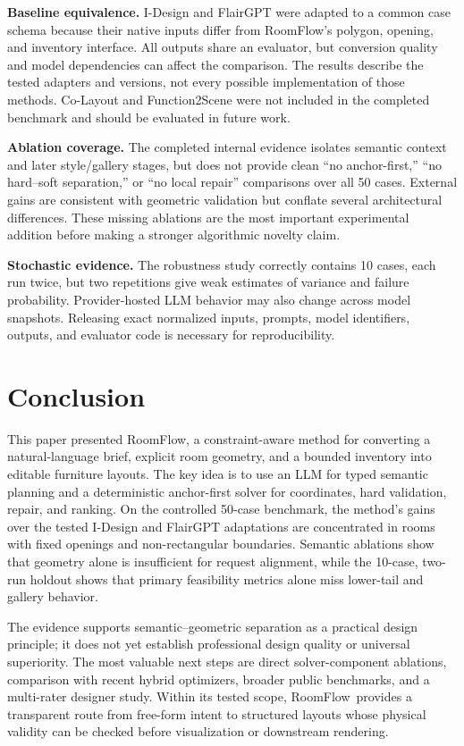 \documentclass[pdflatex,sn-mathphys-num]{sn-jnl}
\newcommand{\method}{RoomFlow}
\begin{document}
\textbf{Baseline equivalence.} I-Design and FlairGPT were adapted to a common case schema because their native inputs differ from \method's polygon, opening, and inventory interface. All outputs share an evaluator, but conversion quality and model dependencies can affect the comparison. The results describe the tested adapters and versions, not every possible implementation of those methods. Co-Layout and Function2Scene were not included in the completed benchmark and should be evaluated in future work.

\textbf{Ablation coverage.} The completed internal evidence isolates semantic context and later style/gallery stages, but does not provide clean ``no anchor-first,'' ``no hard--soft separation,'' or ``no local repair'' comparisons over all 50 cases. External gains are consistent with geometric validation but conflate several architectural differences. These missing ablations are the most important experimental addition before making a stronger algorithmic novelty claim.

\textbf{Stochastic evidence.} The robustness study correctly contains 10 cases, each run twice, but two repetitions give weak estimates of variance and failure probability. Provider-hosted LLM behavior may also change across model snapshots. Releasing exact normalized inputs, prompts, model identifiers, outputs, and evaluator code is necessary for reproducibility.

\section{Conclusion}\label{sec:conclusion}

This paper presented \method, a constraint-aware method for converting a natural-language brief, explicit room geometry, and a bounded inventory into editable furniture layouts. The key idea is to use an LLM for typed semantic planning and a deterministic anchor-first solver for coordinates, hard validation, repair, and ranking. On the controlled 50-case benchmark, the method's gains over the tested I-Design and FlairGPT adaptations are concentrated in rooms with fixed openings and non-rectangular boundaries. Semantic ablations show that geometry alone is insufficient for request alignment, while the 10-case, two-run holdout shows that primary feasibility metrics alone miss lower-tail and gallery behavior.

The evidence supports semantic--geometric separation as a practical design principle; it does not yet establish professional design quality or universal superiority. The most valuable next steps are direct solver-component ablations, comparison with recent hybrid optimizers, broader public benchmarks, and a multi-rater designer study. Within its tested scope, \method\ provides a transparent route from free-form intent to structured layouts whose physical validity can be checked before visualization or downstream rendering.
\end{document}
